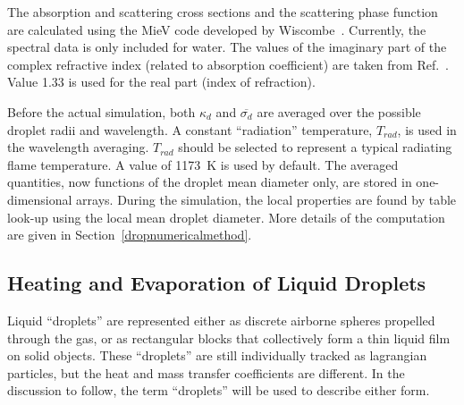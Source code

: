 \documentclass[11pt]{book}
\begin{document}
The absorption and scattering cross sections and the scattering phase
function are calculated using the MieV code developed by
Wiscombe~\cite{Wiscombe}.  Currently, the spectral data is only
included for water. The values of the imaginary part of the complex
refractive index (related to absorption coefficient) are taken from
Ref.~\cite{Hale:1}.  Value 1.33 is used for the real part (index of
refraction).

Before the actual simulation, both $\kappa_d$ and
$\overline{\sigma_d}$ are averaged over the possible droplet radii and
wavelength.  A constant ``radiation'' temperature, $T_{rad}$, is used
in the wavelength averaging.  $T_{rad}$ should be selected to
represent a typical radiating flame temperature. A value of 1173~K is
used by default.  The averaged quantities, now functions of the
droplet mean diameter only, are stored in one-dimensional arrays.
During the simulation, the local properties are found by table
look-up using the local mean droplet diameter.  More details of the
computation are given in Section~\ref{dropnumericalmethod}.



\subsection{Heating and Evaporation of Liquid Droplets}

Liquid ``droplets'' are represented either as discrete airborne spheres propelled through the gas, or as rectangular blocks that collectively form a thin liquid film on solid objects.
These ``droplets'' are still individually tracked as
lagrangian particles, but the heat and mass transfer coefficients are different. In the discussion to follow, the term ``droplets'' will be used to describe either form.
\end{document}
